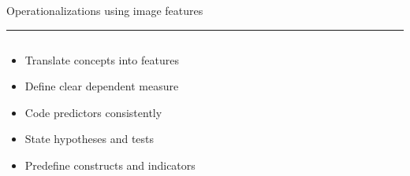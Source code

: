 \documentclass[aspectratio=169]{beamer}
\newcommand{\TitleFont}{\rmfamily}
\begin{document}
\begin{frame}[t]{}
  \vspace*{0.5cm}
  {\TitleFont\fontsize{18}{22}\selectfont\color{LUBronze}Operationalizations using image features\par}
  \vspace{0.3em}
  {\color{LUBronze}\rule{\linewidth}{0.8pt}}\par
  \vspace{0.2cm}
  \begin{columns}[t]
    \begin{column}[t]{0.45\textwidth}
      \vspace*{0pt}
      \begin{itemize}\setlength\itemsep{0.65em}
        \item Translate concepts into features
        \item Define clear dependent measure
        \item Code predictors consistently
        \item State hypotheses and tests
        \item Predefine constructs and indicators
      \end{itemize}
    \end{column}
  \end{columns}
\end{frame}
\end{document}
